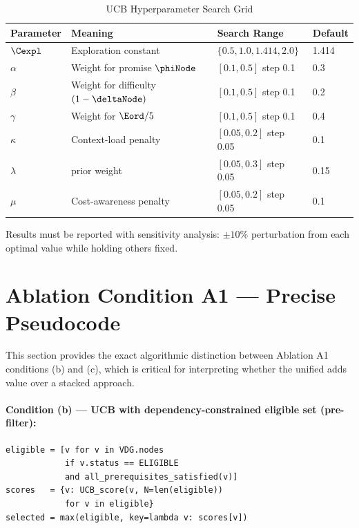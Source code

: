 \begin{table}[h!]
  \centering
  \caption{UCB Hyperparameter Search Grid}\label{tab:ucb-grid}
  \begin{tabular}{llll}
    \hline
    \textbf{Parameter} & \textbf{Meaning} & \textbf{Search Range} & \textbf{Default} \\
    \hline
    $\Cexpl$     & Exploration constant          & $\{0.5, 1.0, 1.414, 2.0\}$ & 1.414 \\
    $\alpha$     & Weight for promise $\phiNode$ & $[0.1, 0.5]$ step 0.1      & 0.3   \\
    $\beta$      & Weight for difficulty $(1-\deltaNode)$ & $[0.1, 0.5]$ step 0.1 & 0.2 \\
    $\gamma$     & Weight for $\Eord/5$          & $[0.1, 0.5]$ step 0.1      & 0.4   \\
    $\kappa$     & Context-load penalty          & $[0.05, 0.2]$ step 0.05    & 0.1   \\
    $\lambda$    & \epss{} prior weight          & $[0.05, 0.3]$ step 0.05    & 0.15  \\
    $\mu$        & Cost-awareness penalty        & $[0.05, 0.2]$ step 0.05    & 0.1   \\
    \hline
  \end{tabular}
\end{table}

Results must be reported with sensitivity analysis: $\pm 10\%$ perturbation from each optimal value while holding others fixed.

\section{Ablation Condition A1 — Precise Pseudocode}
\label{app:ablation-a1}

This section provides the exact algorithmic distinction between Ablation A1 conditions (b) and (c), which is critical for interpreting whether the unified \vdg{} adds value over a stacked approach.

\paragraph{Condition (b) — UCB with dependency-constrained eligible set (pre-filter):}
\begin{verbatim}
eligible = [v for v in VDG.nodes
            if v.status == ELIGIBLE
            and all_prerequisites_satisfied(v)]
scores   = {v: UCB_score(v, N=len(eligible))
            for v in eligible}
selected = max(eligible, key=lambda v: scores[v])
\end{verbatim}

